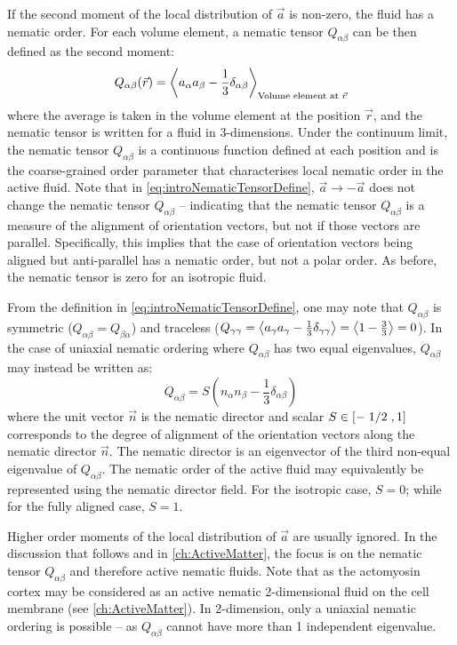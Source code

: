 If the second moment of the local distribution of $\vec{a}$ is non-zero, the fluid has a nematic order. For each volume element, a nematic tensor $Q_{\alpha\beta}$ can be then defined as the second moment:
\begin{equation}\label{eq:introNematicTensorDefine}
    Q_{\alpha\beta}(\vec{r}) = \expval{a_\alpha a_\beta - \frac{1}{3} \delta_{\alpha \beta}}_{\textrm{Volume element at }\vec{r}}
\end{equation}
where the average is taken in the volume element at the position $\vec{r}$, and the nematic tensor is written for a fluid in 3-dimensions. Under the continuum limit, the nematic tensor $Q_{\alpha\beta}$ is a continuous function defined at each position and is the coarse-grained order parameter that characterises local nematic order in the active fluid. Note that in \autoref{eq:introNematicTensorDefine}, $\vec{a} \rightarrow -\vec{a}$ does not change the nematic tensor $Q_{\alpha\beta}$ -- indicating that the nematic tensor $Q_{\alpha\beta}$ is a measure of the alignment of orientation vectors, but not if those vectors are parallel. Specifically, this implies that the case of orientation vectors being aligned but anti-parallel has a nematic order, but not a polar order. As before, the nematic tensor is zero for an isotropic fluid. 

From the definition in \autoref{eq:introNematicTensorDefine}, one may note that $Q_{\alpha\beta}$ is symmetric ($Q_{\alpha\beta} = Q_{\beta\alpha}$) and traceless ($Q_{\gamma\gamma} = \expval{a_\gamma a_\gamma - \frac{1}{3} \delta_{\gamma \gamma}} = \expval{1 - \frac{3}{3}} = 0$). In the case of uniaxial nematic ordering where $Q_{\alpha\beta}$ has two equal eigenvalues, $Q_{\alpha\beta}$ may instead be written as:
\begin{equation}\label{eq:introNematicTensorUniaxialDefine}
    Q_{\alpha\beta} = S\left(n_\alpha n_\beta - \frac{1}{3}\delta_{\alpha\beta}\right)
\end{equation}
where the unit vector $\vec{n}$ is the nematic director and scalar $S \in [-\flatfrac{1}{2},1]$ corresponds to the degree of alignment of the orientation vectors along the nematic director $\vec{n}$. The nematic director is an eigenvector of the third non-equal eigenvalue of $Q_{\alpha\beta}$. The nematic order of the active fluid may equivalently be represented using the nematic director field. For the isotropic case, $S = 0$; while for the fully aligned case, $S = 1$.

Higher order moments of the local distribution of $\vec{a}$ are usually ignored. In the discussion that follows and in \autoref{ch:ActiveMatter}, the focus is on the nematic tensor $Q_{\alpha\beta}$ and therefore active nematic fluids. Note that as the actomyosin cortex may be considered as an active nematic 2-dimensional fluid on the cell membrane \citep{kumar2021actomyosin,julicher2022surface} (see \autoref{ch:ActiveMatter}). In 2-dimension, only a uniaxial nematic ordering is possible -- as $Q_{\alpha\beta}$ cannot have more than 1 independent eigenvalue.

